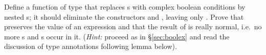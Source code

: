 \begin{isabellebody}
\begin{isamarkuptext}
\begin{exercise}
  Define a function  of type  that
  replaces s with complex boolean conditions by nested
  s; it should eliminate the constructors
   and , leaving only .
  Prove that 
  preserves the value of an expression and that the result of 
  is really normal, i.e.\ no more s and s occur in
  it.  ({\em Hint:} proceed as in \S\ref{sec:boolex} and read the discussion
  of type annotations following lemma  below).
\end{exercise}%
\end{isamarkuptext}%
\isamarkuptrue%
%
\isadelimproof
%
\endisadelimproof
%
\isatagproof
%
\endisatagproof
{\isafoldproof}%
%
\isadelimproof
%
\endisadelimproof
%
\isadelimproof
%
\endisadelimproof
%
\isatagproof
%
\endisatagproof
{\isafoldproof}%
%
\isadelimproof
%
\endisadelimproof
%
\isadelimtheory
%
\endisadelimtheory
%
\isatagtheory
%
\endisatagtheory
{\isafoldtheory}%
%
\isadelimtheory
%
\endisadelimtheory
\end{isabellebody}%

